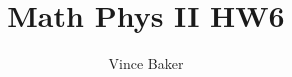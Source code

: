\documentclass[a4paper,12pt]{article}
\title{Math Phys II HW6}
\author{Vince Baker}
\numberwithin{equation}{section}
\begin{document}
\maketitle

\begin{abstract}

\end{abstract}

\section{}
\end{document}
